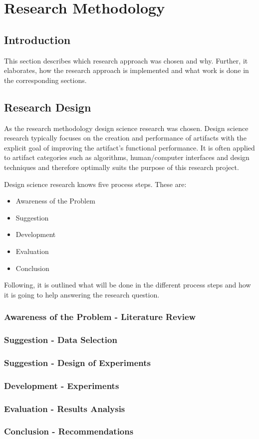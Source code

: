 
\chapter{Research Methodology} %

\section{Introduction}
This section describes which research approach was chosen and why. Further, it elaborates, how the research approach is implemented and what work is done in the corresponding sections. 

\section{Research Design}
As the research methodology design science research was chosen. Design science research typically focuses on the creation and performance of artifacts with the explicit goal of improving the artifact's functional performance. It is often applied to artifact categories such as algorithms, human/computer interfaces and design techniques and therefore optimally suits the purpose of this research project.

Design science research knows five process steps. These are:

\begin{itemize}
	\item Awareness of the Problem
	\item Suggestion
	\item Development
	\item Evaluation
	\item Conclusion
\end{itemize}

Following, it is outlined what will be done in the different process steps and how it is going to help answering the research question. 

\subsection{Awareness of the Problem - Literature Review}

\subsection{Suggestion - Data Selection}

\subsection{Suggestion - Design of Experiments}

\subsection{Development - Experiments}

\subsection{Evaluation - Results Analysis}

\subsection{Conclusion - Recommendations}




